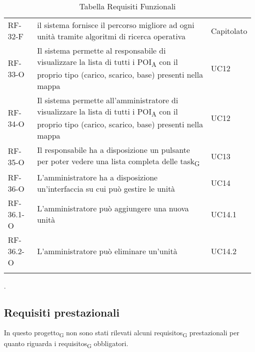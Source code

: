 \begin{longtable}{ 
		>{}p{} 
		>{}p{}
		>{}p{} }
RF-32-F & il sistema fornisce il percorso migliore ad ogni unità tramite algoritmi di ricerca operativa & Capitolato\tabularnewline
RF-33-O & Il sistema permette al responsabile di visualizzare la lista di tutti i \acrshort{POI}\textsubscript{A} con il proprio tipo (carico, scarico, base) presenti nella mappa & UC12\tabularnewline
RF-34-O & Il sistema permette all'amministratore di visualizzare la lista di tutti i \acrshort{POI}\textsubscript{A} con il proprio tipo (carico, scarico, base) presenti nella mappa & UC12\tabularnewline
RF-35-O & Il responsabile ha a disposizione un pulsante per poter vedere una lista completa delle \gls{task}\textsubscript{G} & UC13\tabularnewline
RF-36-O & L'amministratore ha a disposizione un'interfaccia su cui può gestire le unità & UC14\tabularnewline
RF-36.1-O & L'amministratore può aggiungere una nuova unità & UC14.1\tabularnewline
RF-36.2-O & L'amministratore può eliminare un'unità & UC14.2\tabularnewline
\caption{Tabella Requisiti Funzionali\label{ Tabella Requisiti Funzionali}}\\
\end{longtable}.
\newline 
\subsection{Requisiti prestazionali}
In questo \gls{progetto}\textsubscript{G} non sono stati rilevati alcuni \glspl{requisito}\textsubscript{G} prestazionali per quanto riguarda i \glspl{requisito}\textsubscript{G} obbligatori.
\newline 
